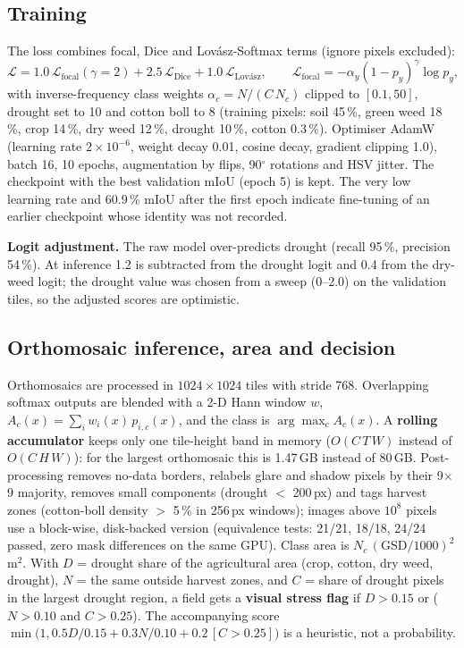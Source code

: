 \documentclass[11pt,a4paper,oneside]{article}
\begin{document}
\subsection{Training}
The loss combines focal, Dice and Lov\'asz-Softmax terms (ignore pixels excluded):
\begin{equation}
\mathcal{L} = 1.0\,\mathcal{L}_{\text{focal}}(\gamma{=}2) + 2.5\,\mathcal{L}_{\text{Dice}} + 1.0\,\mathcal{L}_{\text{Lov\'asz}}, \qquad
\mathcal{L}_{\text{focal}} = -\alpha_{y}(1-p_y)^{\gamma}\log p_y,
\end{equation}
with inverse-frequency class weights $\alpha_c = N/(C\,N_c)$ clipped to $[0.1, 50]$, drought set to 10 and cotton boll to 8 (training pixels: soil 45\,\%, green weed 18\,\%, crop 14\,\%, dry weed 12\,\%, drought 10\,\%, cotton 0.3\,\%). Optimiser AdamW (learning rate $2\!\times\!10^{-6}$, weight decay 0.01, cosine decay, gradient clipping 1.0), batch 16, 10 epochs, augmentation by flips, 90$^\circ$ rotations and HSV jitter. The checkpoint with the best validation mIoU (epoch 5) is kept. The very low learning rate and 60.9\,\% mIoU after the first epoch indicate fine-tuning of an earlier checkpoint whose identity was not recorded.

\textbf{Logit adjustment.} The raw model over-predicts drought (recall 95\,\%, precision 54\,\%). At inference 1.2 is subtracted from the drought logit and 0.4 from the dry-weed logit; the drought value was chosen from a sweep (0--2.0) on the validation tiles, so the adjusted scores are optimistic.

\subsection{Orthomosaic inference, area and decision}
Orthomosaics are processed in $1024\times1024$ tiles with stride 768. Overlapping softmax outputs are blended with a 2-D Hann window $w$, $A_c(x) = \sum_i w_i(x)\,p_{i,c}(x)$, and the class is $\arg\max_c A_c(x)$. A \textbf{rolling accumulator} keeps only one tile-height band in memory ($O(C\,T\,W)$ instead of $O(C\,H\,W)$): for the largest orthomosaic this is 1.47\,GB instead of 80\,GB. Post-processing removes no-data borders, relabels glare and shadow pixels by their 9$\times$9 majority, removes small components (drought $<$ 200\,px) and tags harvest zones (cotton-boll density $>$ 5\,\% in 256\,px windows); images above $10^8$ pixels use a block-wise, disk-backed version (equivalence tests: 21/21, 18/18, 24/24 passed, zero mask differences on the same GPU). Class area is $N_c\,(\mathrm{GSD}/1000)^2$ m$^2$. With $D$ = drought share of the agricultural area (crop, cotton, dry weed, drought), $N$ = the same outside harvest zones, and $C$ = share of drought pixels in the largest drought region, a field gets a \textbf{visual stress flag} if $D > 0.15$ or ($N > 0.10$ and $C > 0.25$). The accompanying score $\min\!\big(1, 0.5D/0.15 + 0.3N/0.10 + 0.2\,[C>0.25]\big)$ is a heuristic, not a probability.
\end{document}
